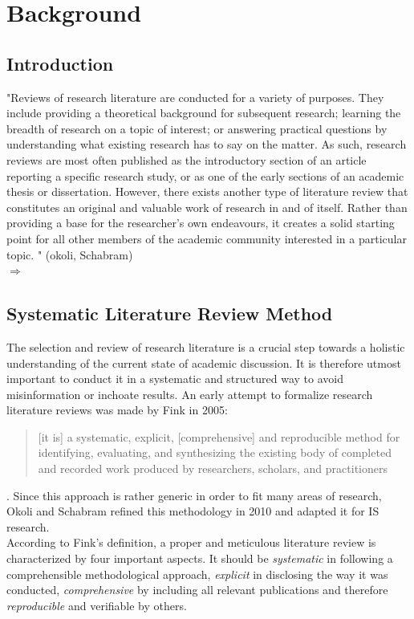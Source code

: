\chapter{Background}\label{chp:background}


\section{Introduction}

"Reviews of research literature are conducted for a variety of purposes. They include
providing a theoretical background for subsequent research; learning the breadth of research on a
topic of interest; or answering practical questions by understanding what existing research has to
say on the matter. As such, research reviews are most often published as the introductory section
of an article reporting a specific research study, or as one of the early sections of an academic
thesis or dissertation. However, there exists another type of literature review that constitutes an
original and valuable work of research in and of itself. Rather than providing a base for the
researcher’s own endeavours, it creates a solid starting point for all other members of the
academic community interested in a particular topic. " (okoli, Schabram)\\
$\Longrightarrow$ 
\clearpage
\section{Systematic Literature Review Method}\label{sec:LitRes}

The selection and review of research literature is a crucial step towards a holistic understanding of the current state of academic discussion. It is therefore utmost important to conduct it in a systematic and structured way to avoid misinformation or inchoate results. An early attempt to formalize research literature reviews was made by Fink in 2005: \blockquote{[it is] a systematic, explicit,
[comprehensive] and reproducible method for identifying, evaluating, and synthesizing
the existing body of completed and recorded work produced by researchers, scholars, and
practitioners}\autocite{Fink2015ConductingPaper}. Since this approach is rather generic in order to fit many areas of research, Okoli and Schabram refined this methodology in 2010 and adapted it for \acf{IS} research. \\
According to Fink's definition, a proper and meticulous literature review is characterized by four important aspects. It should be \textit{systematic} in following a comprehensible methodological approach, \textit{explicit} in disclosing the way it was conducted, \textit{comprehensive} by including all relevant publications and therefore \textit{reproducible} and verifiable by others. 

